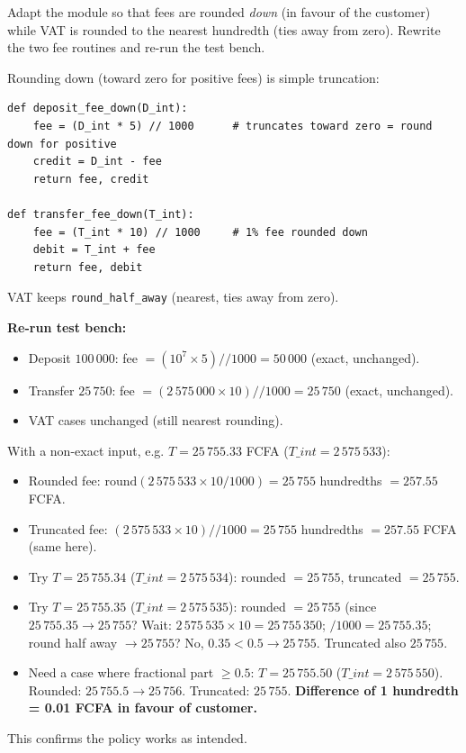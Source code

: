 \documentclass[11pt]{article}
\begin{document}
\begin{exercice}
Adapt the module so that fees are rounded \emph{down} (in favour of the customer) while VAT is rounded to the nearest hundredth (ties away from zero). Rewrite the two fee routines and re-run the test bench.
\end{exercice}

\begin{corrige}[Extension]
Rounding down (toward zero for positive fees) is simple truncation:
\begin{verbatim}
def deposit_fee_down(D_int):
    fee = (D_int * 5) // 1000      # truncates toward zero = round down for positive
    credit = D_int - fee
    return fee, credit

def transfer_fee_down(T_int):
    fee = (T_int * 10) // 1000     # 1% fee rounded down
    debit = T_int + fee
    return fee, debit
\end{verbatim}
VAT keeps \texttt{round\_half\_away} (nearest, ties away from zero).

\textbf{Re-run test bench:}
\begin{itemize}
\item Deposit $100\,000$: fee $= (10^7 \times 5)//1000 = 50\,000$ (exact, unchanged).
\item Transfer $25\,750$: fee $= (2\,575\,000 \times 10)//1000 = 25\,750$ (exact, unchanged).
\item VAT cases unchanged (still nearest rounding).
\end{itemize}
With a non-exact input, e.g. $T = 25\,755.33$ FCFA ($T\_int = 2\,575\,533$):
\begin{itemize}
\item Rounded fee: $\mathrm{round}(2\,575\,533 \times 10 / 1000) = 25\,755$ hundredths $= 257.55$ FCFA.
\item Truncated fee: $(2\,575\,533 \times 10)//1000 = 25\,755$ hundredths $= 257.55$ FCFA (same here).
\item Try $T = 25\,755.34$ ($T\_int = 2\,575\,534$): rounded $= 25\,755$, truncated $= 25\,755$.
\item Try $T = 25\,755.35$ ($T\_int = 2\,575\,535$): rounded $= 25\,755$ (since $25\,755.35 \to 25\,755$? Wait: $2\,575\,535 \times 10 = 25\,755\,350$; $/1000 = 25\,755.35$; round half away $\to 25\,755$? No, $0.35 < 0.5 \to 25\,755$. Truncated also $25\,755$.
\item Need a case where fractional part $\ge 0.5$: $T = 25\,755.50$ ($T\_int = 2\,575\,550$). Rounded: $25\,755.5 \to 25\,756$. Truncated: $25\,755$. \textbf{Difference of 1 hundredth = 0.01 FCFA in favour of customer.}
\end{itemize}
This confirms the policy works as intended.
\end{corrige}
\end{document}
